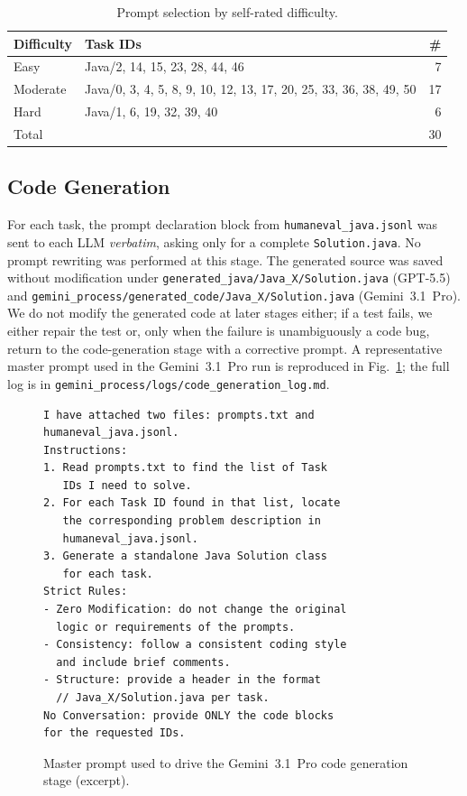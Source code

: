 \documentclass[journal]{IEEEtran}
\begin{document}
\begin{table}[!t]
\centering
\caption{Prompt selection by self-rated difficulty.}
\label{tab:difficulty}
\renewcommand{\arraystretch}{1.15}
\begin{tabular}{@{}l p{} r@{}}
\toprule
\textbf{Difficulty} & \textbf{Task IDs} & \textbf{\#} \\
\midrule
Easy     & Java/2, 14, 15, 23, 28, 44, 46            & 7  \\
Moderate & Java/0, 3, 4, 5, 8, 9, 10, 12, 13, 17,
            20, 25, 33, 36, 38, 49, 50               & 17 \\
Hard     & Java/1, 6, 19, 32, 39, 40                 & 6  \\
\midrule
Total    &                                           & 30 \\
\bottomrule
\end{tabular}
\end{table}

\subsection{Code Generation}
\label{sec:codegen}
For each task, the prompt declaration block from
\texttt{humaneval\_java.jsonl} was sent to each LLM
\emph{verbatim}, asking only for a complete
\texttt{Solution.java}. No prompt rewriting was performed at
this stage. The generated source was saved without
modification under \texttt{generated\_java/Java\_X/Solution.java}
(GPT-5.5) and \texttt{gemini\_process/generated\_code/Java\_X/Solution.java}
(Gemini~3.1~Pro). We do not modify the generated code at later stages
either; if a test fails, we either repair the test or, only
when the failure is unambiguously a code bug, return to the
code-generation stage with a corrective prompt. A
representative master prompt used in the Gemini~3.1~Pro run is
reproduced in Fig.~\ref{fig:masterprompt}; the full log is in
\texttt{gemini\_process/logs/code\_generation\_log.md}.

\begin{figure}[!t]
\begin{lstlisting}[language={}]
I have attached two files: prompts.txt and
humaneval_java.jsonl.
Instructions:
1. Read prompts.txt to find the list of Task
   IDs I need to solve.
2. For each Task ID found in that list, locate
   the corresponding problem description in
   humaneval_java.jsonl.
3. Generate a standalone Java Solution class
   for each task.
Strict Rules:
- Zero Modification: do not change the original
  logic or requirements of the prompts.
- Consistency: follow a consistent coding style
  and include brief comments.
- Structure: provide a header in the format
  // Java_X/Solution.java per task.
No Conversation: provide ONLY the code blocks
for the requested IDs.
\end{lstlisting}
\caption{Master prompt used to drive the Gemini~3.1~Pro code
generation stage (excerpt).}
\label{fig:masterprompt}
\end{figure}
\end{document}
